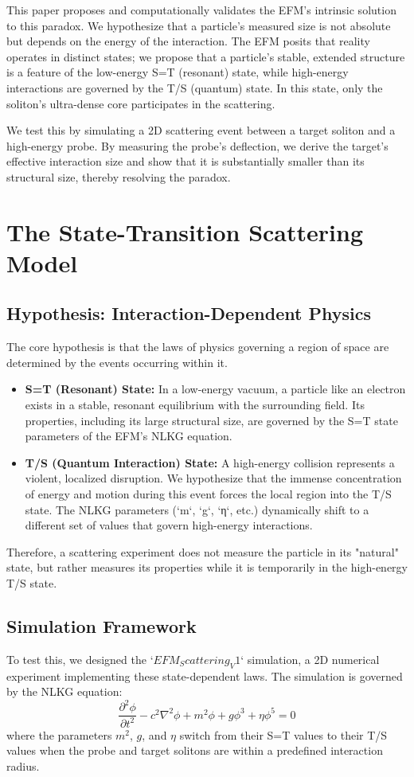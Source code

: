 \documentclass[11pt, twoside]{article}
\begin{document}
This paper proposes and computationally validates the EFM's intrinsic solution to this paradox. We hypothesize that a particle's measured size is not absolute but depends on the energy of the interaction. The EFM posits that reality operates in distinct states; we propose that a particle's stable, extended structure is a feature of the low-energy S=T (resonant) state, while high-energy interactions are governed by the T/S (quantum) state. In this state, only the soliton's ultra-dense core participates in the scattering.

We test this by simulating a 2D scattering event between a target soliton and a high-energy probe. By measuring the probe's deflection, we derive the target's effective interaction size and show that it is substantially smaller than its structural size, thereby resolving the paradox.

\section{The State-Transition Scattering Model}
\subsection{Hypothesis: Interaction-Dependent Physics}
The core hypothesis is that the laws of physics governing a region of space are determined by the events occurring within it.
\begin{itemize}
    \item \textbf{S=T (Resonant) State:} In a low-energy vacuum, a particle like an electron exists in a stable, resonant equilibrium with the surrounding field. Its properties, including its large structural size, are governed by the S=T state parameters of the EFM's NLKG equation.
    \item \textbf{T/S (Quantum Interaction) State:} A high-energy collision represents a violent, localized disruption. We hypothesize that the immense concentration of energy and motion during this event forces the local region into the T/S state. The NLKG parameters (`m`, `g`, `η`, etc.) dynamically shift to a different set of values that govern high-energy interactions.
\end{itemize}
Therefore, a scattering experiment does not measure the particle in its "natural" state, but rather measures its properties while it is temporarily in the high-energy T/S state.

\subsection{Simulation Framework}
To test this, we designed the `$EFM_Scattering_V1$` simulation, a 2D numerical experiment implementing these state-dependent laws. The simulation is governed by the NLKG equation:
\begin{equation}
\frac{\partial^2\phi}{\partial t^2} - c^2\nabla^2\phi + m^2\phi + g\phi^3 + \eta\phi^5 = 0
\end{equation}
where the parameters \(m^2\), \(g\), and \(\eta\) switch from their S=T values to their T/S values when the probe and target solitons are within a predefined interaction radius.
\end{document}
